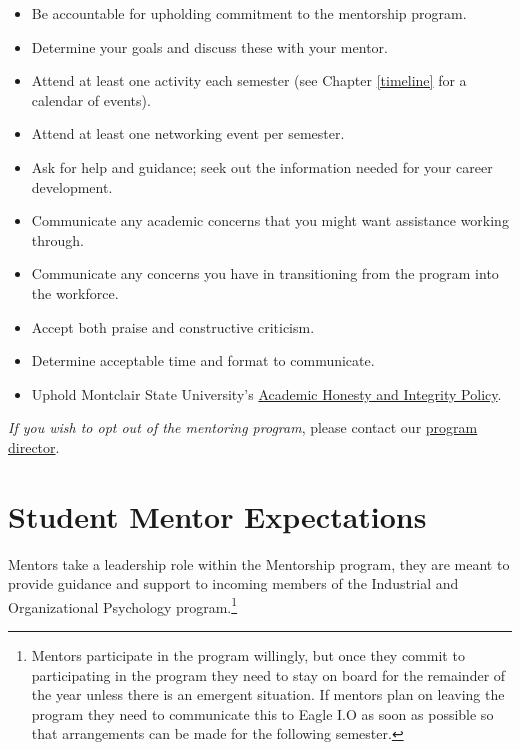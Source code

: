 \documentclass[
  openany]{book}
\providecommand{\tightlist}{%
  \setlength{\itemsep}{0pt}\setlength{\parskip}{0pt}}
\begin{document}
\begin{itemize}
\tightlist
\item
  Be accountable for upholding commitment to the mentorship program.
\item
  Determine your goals and discuss these with your mentor.
\item
  Attend at least one activity each semester (see Chapter \ref{timeline} for a calendar of events).
\item
  Attend at least one networking event per semester.
\item
  Ask for help and guidance; seek out the information needed for your career development.
\item
  Communicate any academic concerns that you might want assistance working through.
\item
  Communicate any concerns you have in transitioning from the program into the workforce.
\item
  Accept both praise and constructive criticism.
\item
  Determine acceptable time and format to communicate.
\item
  Uphold Montclair State University's \href{https://www.montclair.edu/policies/all-policies/academic-honesty-and-integrity/}{Academic Honesty and Integrity Policy}.
\end{itemize}

\emph{If you wish to opt out of the mentoring program}, please contact our \href{mailto:simonetd@montclair.edu}{program director}.

\hypertarget{student-mentor-expectations}{%
\section{Student Mentor Expectations}\label{student-mentor-expectations}}

Mentors take a leadership role within the Mentorship program, they are meant to provide guidance and support to incoming members of the Industrial and Organizational Psychology program.\footnote{Mentors participate in the program willingly, but once they commit to participating in the program they need to stay on board for the remainder of the year unless there is an emergent situation. If mentors plan on leaving the program they need to communicate this to Eagle I.O as soon as possible so that arrangements can be made for the following semester.}
\end{document}

